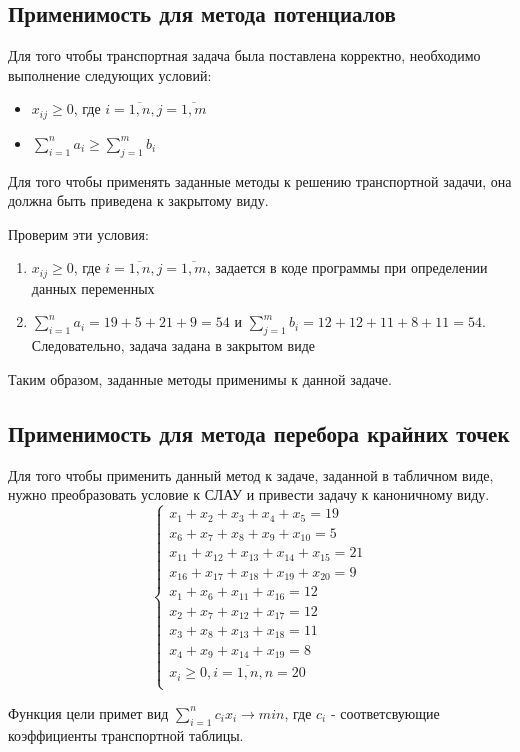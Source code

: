 \documentclass[../body.tex]{subfiles}
\begin{document}
\subsection{Применимость для метода потенциалов}
Для того чтобы транспортная задача была поставлена корректно, необходимо выполнение следующих условий:
\begin{itemize}
    \item $x_{ij}\geq 0$, где $i=\overline{1,n}, j=\overline{1,m}$
    \item $\sum_{i=1}^{n} a_i \geq \sum_{j=1}^{m} b_i$
\end{itemize}

Для того чтобы применять заданные методы к решению транспортной задачи, она должна быть приведена к закрытому виду.

Проверим эти условия:
\begin{enumerate}
    \item $x_{ij}\geq 0$, где $i=\overline{1,n}, j=\overline{1,m}$, задается в коде программы при определении данных переменных
    \item $\sum_{i=1}^{n} a_i=19+5+21+9=54$ и $\sum_{j=1}^{m} b_i=12+12+11+8+11=54$. Следовательно, задача задана в закрытом виде
\end{enumerate}

Таким образом, заданные методы применимы к данной задаче.

\subsection{Применимость для метода перебора крайних точек}
Для того чтобы применить данный метод к задаче, заданной в табличном виде, нужно преобразовать условие к СЛАУ и привести задачу к каноничному виду.
\begin{equation}
    \left\{
    \begin{array}{ll}
         x_1+x_2+x_3+x_4+x_5=19\\
         x_6+x_7+x_8+x_9+x_{10}=5\\
         x_{11}+x_{12}+x_{13}+x_{14}+x_{15}=21\\
         x_{16}+x_{17}+x_{18}+x_{19}+x_{20}=9\\
         x_1+x_6+x_{11}+x_{16}=12\\
         x_2+x_7+x_{12}+x_{17}=12\\
         x_3+x_8+x_{13}+x_{18}=11\\
         x_4+x_9+x_{14}+x_{19}=8\\
         x_i \geq 0, i=\overline{1,n}, n=20\\
    \end{array}
    \right.
\end{equation}

Функция цели примет вид $\sum_{i=1}^n{c_ix_i}\rightarrow min$, где $c_i$ - соответсвующие коэффициенты транспортной таблицы.
\end{document}
